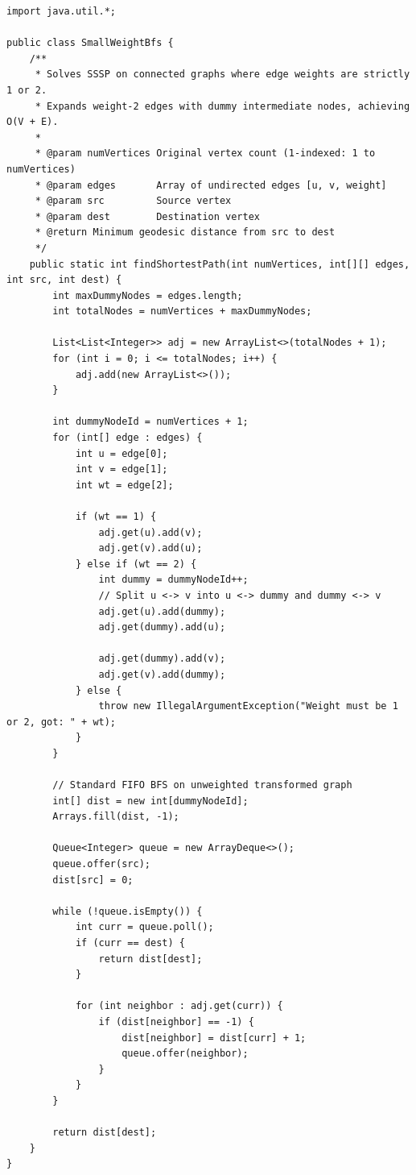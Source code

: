 \documentclass[10pt,journal,compsoc,onecolumn]{IEEEtran}
\begin{document}
\begin{lstlisting}[caption={Small-Weight SSSP via Dummy Node Expansion}, label={lst:small_weight_bfs}]
import java.util.*;

public class SmallWeightBfs {
    /**
     * Solves SSSP on connected graphs where edge weights are strictly 1 or 2.
     * Expands weight-2 edges with dummy intermediate nodes, achieving O(V + E).
     *
     * @param numVertices Original vertex count (1-indexed: 1 to numVertices)
     * @param edges       Array of undirected edges [u, v, weight]
     * @param src         Source vertex
     * @param dest        Destination vertex
     * @return Minimum geodesic distance from src to dest
     */
    public static int findShortestPath(int numVertices, int[][] edges, int src, int dest) {
        int maxDummyNodes = edges.length;
        int totalNodes = numVertices + maxDummyNodes;

        List<List<Integer>> adj = new ArrayList<>(totalNodes + 1);
        for (int i = 0; i <= totalNodes; i++) {
            adj.add(new ArrayList<>());
        }

        int dummyNodeId = numVertices + 1;
        for (int[] edge : edges) {
            int u = edge[0];
            int v = edge[1];
            int wt = edge[2];

            if (wt == 1) {
                adj.get(u).add(v);
                adj.get(v).add(u);
            } else if (wt == 2) {
                int dummy = dummyNodeId++;
                // Split u <-> v into u <-> dummy and dummy <-> v
                adj.get(u).add(dummy);
                adj.get(dummy).add(u);

                adj.get(dummy).add(v);
                adj.get(v).add(dummy);
            } else {
                throw new IllegalArgumentException("Weight must be 1 or 2, got: " + wt);
            }
        }

        // Standard FIFO BFS on unweighted transformed graph
        int[] dist = new int[dummyNodeId];
        Arrays.fill(dist, -1);

        Queue<Integer> queue = new ArrayDeque<>();
        queue.offer(src);
        dist[src] = 0;

        while (!queue.isEmpty()) {
            int curr = queue.poll();
            if (curr == dest) {
                return dist[dest];
            }

            for (int neighbor : adj.get(curr)) {
                if (dist[neighbor] == -1) {
                    dist[neighbor] = dist[curr] + 1;
                    queue.offer(neighbor);
                }
            }
        }

        return dist[dest];
    }
}
\end{lstlisting}
\end{document}
